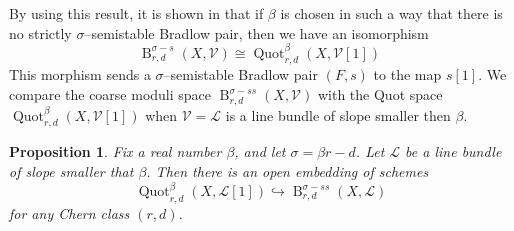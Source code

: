 \documentclass[11pt]{article}
\newtheorem{proposition}[theorem]{Proposition}
\newcommand{\framing}{\mathcal{V}}
\newcommand{\linebundle}{\mathcal{L}}
\newcommand{\Quotbetaonerd}{\operatorname{Quot}_{r,d}^{\beta}(X,\mathcal{L}[1])}
\newcommand{\brad}{\operatorname{{B}}^{\sigma - ss}_{r,d}(X,\mathcal{V})}
\newcommand{\bradlb}{\operatorname{{B}}^{\sigma - ss}_{r,d}(X,\mathcal{L})}
\begin{document}
\noindent By using this result, it is shown in \cite{10.4134/JKMS.J230331} that if $\beta$ is chosen in such a way that there is no strictly $\sigma$--semistable Bradlow pair, then we have an isomorphism
\[
    \operatorname{B}^{\sigma -s}_{r,d}(X,\framing)  \cong {\operatorname{Quot}_{r,d}^{\beta}(X,\mathcal{V}[1])} \  
\]
This morphism sends a $\sigma$--semistable Bradlow pair $(F,s)$ to the map $s[1]$. We compare the coarse moduli space $\brad$ with the Quot space ${\operatorname{Quot}_{r,d}^{\beta}(X,\mathcal{V}[1])}$ when $\framing = \linebundle$ is a line bundle of slope smaller then $\beta$. 

\begin{proposition}\label{prop : BradlowQuot}
    Fix a real number $\beta$, and let $\sigma = \beta r - d$. Let $\linebundle$ be a line bundle of slope smaller that $\beta$. Then there is an open embedding of schemes
    \[
        \Quotbetaonerd \hookrightarrow \bradlb 
    \]
    for any Chern class $(r,d)$.
\end{proposition}
\end{document}
